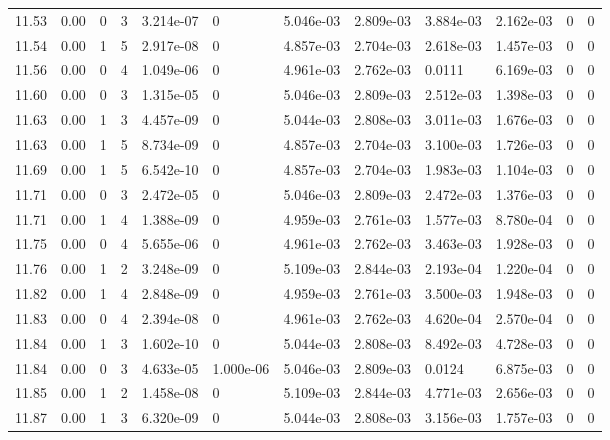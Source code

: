 \documentclass[preview]{standalone}
\begin{document}
{{{{{{{{{{{{{{{\begin{tabular}{L{1.2cm}C{1.2cm} C{0.3cm}C{0.5cm} C{1.4cm}C{1.4cm} C{1.4cm}C{1.4cm} C{1.6cm}C{1.6cm} C{1.6cm}C{1.6cm}}
  11.53  &  0.00  & 0     &  3 &  3.214e-07  & 0  &  5.046e-03&   2.809e-03& 3.884e-03 & 2.162e-03   &  0 & 0  \\ 
  11.54  &  0.00  & 1     &  5 &  2.917e-08  & 0  &  4.857e-03&   2.704e-03& 2.618e-03 & 1.457e-03   &  0 & 0  \\ 
  11.56  &  0.00  & 0     &  4 &  1.049e-06  & 0  &  4.961e-03&   2.762e-03& 0.0111 & 6.169e-03   &  0 & 0  \\ 
  11.60  &  0.00  & 0     &  3 &  1.315e-05  & 0  &  5.046e-03&   2.809e-03& 2.512e-03 & 1.398e-03   &  0 & 0  \\ 
  11.63  &  0.00  & 1     &  3 &  4.457e-09  & 0  &  5.044e-03&   2.808e-03& 3.011e-03 & 1.676e-03   &  0 & 0  \\ 
  11.63  &  0.00  & 1     &  5 &  8.734e-09  & 0  &  4.857e-03&   2.704e-03& 3.100e-03 & 1.726e-03   &  0 & 0  \\ 
  11.69  &  0.00  & 1     &  5 &  6.542e-10  & 0  &  4.857e-03&   2.704e-03& 1.983e-03 & 1.104e-03   &  0 & 0  \\ 
  11.71  &  0.00  & 0     &  3 &  2.472e-05  & 0  &  5.046e-03&   2.809e-03& 2.472e-03 & 1.376e-03   &  0 & 0  \\ 
  11.71  &  0.00  & 1     &  4 &  1.388e-09  & 0  &  4.959e-03&   2.761e-03& 1.577e-03 & 8.780e-04   &  0 & 0  \\ 
  11.75  &  0.00  & 0     &  4 &  5.655e-06  & 0  &  4.961e-03&   2.762e-03& 3.463e-03 & 1.928e-03   &  0 & 0  \\ 
  11.76  &  0.00  & 1     &  2 &  3.248e-09  & 0  &  5.109e-03&   2.844e-03& 2.193e-04 & 1.220e-04   &  0 & 0  \\ 
  11.82  &  0.00  & 1     &  4 &  2.848e-09  & 0  &  4.959e-03&   2.761e-03& 3.500e-03 & 1.948e-03   &  0 & 0  \\ 
  11.83  &  0.00  & 0     &  4 &  2.394e-08  & 0  &  4.961e-03&   2.762e-03& 4.620e-04 & 2.570e-04   &  0 & 0  \\ 
  11.84  &  0.00  & 1     &  3 &  1.602e-10  & 0  &  5.044e-03&   2.808e-03& 8.492e-03 & 4.728e-03   &  0 & 0  \\ 
  11.84  &  0.00  & 0     &  3 &  4.633e-05  & 1.000e-06  &  5.046e-03&   2.809e-03& 0.0124 & 6.875e-03   &  0 & 0  \\ 
  11.85  &  0.00  & 1     &  2 &  1.458e-08  & 0  &  5.109e-03&   2.844e-03& 4.771e-03 & 2.656e-03   &  0 & 0  \\ 
  11.87  &  0.00  & 1     &  3 &  6.320e-09  & 0  &  5.044e-03&   2.808e-03& 3.156e-03 & 1.757e-03   &  0 & 0  \\ 

\end{tabular}}}}}}}}}}}}}}}}
\end{document}
